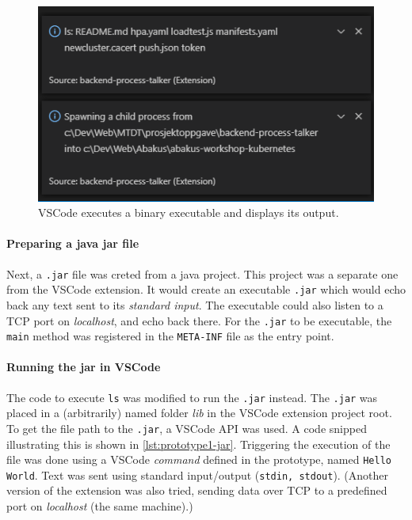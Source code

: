 \begin{figure}[htbp]  %
  \centering
  \includegraphics[width=.5\textwidth]{figures/vscode-extension-child_process-ls}
  \caption[VSCode Communicates with a Binary Executable]{VSCode executes a binary executable and displays its output.}\label{fig:prototype-1-ls}
\end{figure}

\paragraph*{Preparing a java jar file}
Next, a \texttt{.jar} file was creted from a java project.
This project was a separate one from the VSCode extension.
It would create an executable \texttt{.jar} which would echo back any text sent to its \emph{standard input}. The executable could also listen to a TCP port on \emph{localhost}, and echo back there.
For the \texttt{.jar} to be executable, the \texttt{main} method was registered in the \texttt{META-INF} file as the entry point.

\paragraph*{Running the jar in VSCode}
The code to execute \texttt{ls} was modified to run the \texttt{.jar} instead.
The \texttt{.jar} was placed in a (arbitrarily) named folder \emph{lib} in the VSCode extension project root.
To get the file path to the \texttt{.jar}, a \gls{VSCode} \acrshort{API} was used.
A code snipped illustrating this is shown in \cref{lst:prototype1-jar}.
Triggering the execution of the file was done using a \gls{VSCode} \emph{command} defined in the prototype, named \texttt{Hello World}.
Text was sent using standard input/output (\texttt{stdin, stdout}).
(Another version of the extension was also tried, sending data over TCP to a predefined port on \emph{localhost} (the same machine).)



